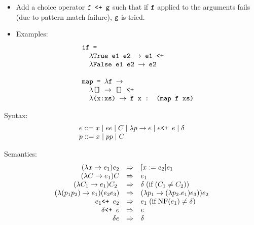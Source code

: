 \documentclass[leqno, fleqn]{foils}
\newcommand{\ve}[1]{\ensuremath{\text{\tt #1}}}
\newcommand{\ra}{\ensuremath{\rightarrow} }
\newcommand{\Ra}{\ensuremath{\Rightarrow} }
\newcommand{\plus}{\ve{ <+ } }
\newcommand{\fail}{\ensuremath{\delta }}
\newcommand{\alt}{\ensuremath{\; | \;}}
\newcommand{\NF}{\ensuremath{\text{NF}}}
\begin{document}

\begin{itemize}
\item
Add a choice operator \ve{f <+ g} such that if \ve{f} applied to the
arguments fails (due to pattern match failure), \ve{g} is tried.
\item
Examples:
\[
\begin{array}{l}
\ve{if =} \\
\quad \ve{$\lambda$True e1 e2 \ra e1 <+} \\
\quad \ve{$\lambda$False e1 e2 \ra e2} \\
\\
\ve{map = $\lambda$f \ra} \\
\quad \ve{$\lambda$[] \ra [] <+} \\
\quad \ve{$\lambda$(x:xs) \ra f x : (map f xs)} \\
\end{array}
\]
\end{itemize}



Syntax:
\[
\begin{array}{l}
e ::= x \alt e e \alt C \alt \lambda p \ra e 
 \alt e \plus e \alt \fail\\
p ::= x \alt p p \alt C \\
\end{array}
\]

Semantics:
\[
\begin{array}{rcl}
(\lambda x \ra e_1) e_2 & \Ra & [x := e_2] e_1  \\

(\lambda C \ra e_1) C & \Ra & e_1 \\

(\lambda C_1 \ra e_1) C_2 \;  & \Ra & \fail \; (\text{if} \; (C_1 \neq
C_2)) \\

(\lambda (p_1 p_2) \ra e_1) (e_2 e_3) & \Ra 
  & (\lambda p_1 \ra (\lambda p_2 . e_1) e_3)) e_2
  \\

e_1 \plus e_2 & \Ra & e_1 \; (\text{if} \; \NF(e_1) \neq \fail) \\

\fail \plus e & \Ra & e \\

\fail e & \Ra & \fail 
\end{array}
\]


\end{document}
